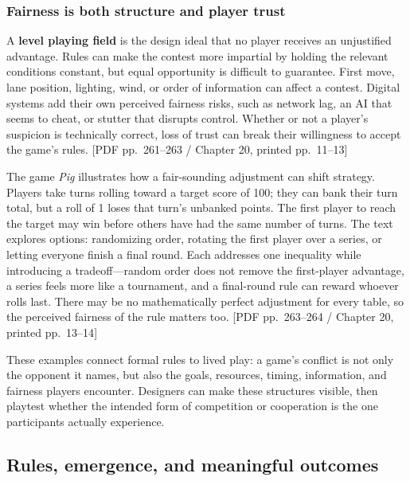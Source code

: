 \subsubsection{Fairness is both structure and player trust}\label{05-engine-i-ch009-fairness-is-both-structure-and-player-trust}

\hypertarget{05-engine-i-ch009-fairness-is-both-structure-and-player-trust}{}

A \textbf{level playing field} is the design ideal that no player receives an unjustified advantage. Rules can make the contest more impartial by holding the relevant conditions constant, but equal opportunity is difficult to guarantee. First move, lane position, lighting, wind, or order of information can affect a contest. Digital systems add their own perceived fairness risks, such as network lag, an AI that seems to cheat, or stutter that disrupts control. Whether or not a player's suspicion is technically correct, loss of trust can break their willingness to accept the game's rules. {[}PDF pp.~261--263 / Chapter 20, printed pp.~11--13{]}

The game \emph{Pig} illustrates how a fair-sounding adjustment can shift strategy. Players take turns rolling toward a target score of 100; they can bank their turn total, but a roll of 1 loses that turn's unbanked points. The first player to reach the target may win before others have had the same number of turns. The text explores options: randomizing order, rotating the first player over a series, or letting everyone finish a final round. Each addresses one inequality while introducing a tradeoff---random order does not remove the first-player advantage, a series feels more like a tournament, and a final-round rule can reward whoever rolls last. There may be no mathematically perfect adjustment for every table, so the perceived fairness of the rule matters too. {[}PDF pp.~263--264 / Chapter 20, printed pp.~13--14{]}

These examples connect formal rules to lived play: a game's conflict is not only the opponent it names, but also the goals, resources, timing, information, and fairness players encounter. Designers can make these structures visible, then playtest whether the intended form of competition or cooperation is the one participants actually experience.

\subsection{Rules, emergence, and meaningful outcomes}\label{05-engine-i-ch009-rules-emergence-and-meaningful-outcomes}

